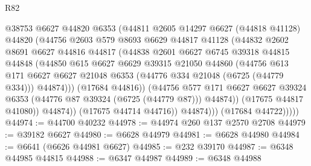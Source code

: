 \begin{lexlean}{R82}
\begin{coremodule}
                        @38753
                        @6627
                        @44820
                        @6353
                        (@44811
                          @2605
                          @14297
                          @6627
                          (@44818 @41128)
                          @44820
                          (@44756
                            @2603
                            @579
                            @8693
                            @6629
                            @44817
                            @41128
                            (@44832
                              @2602
                              @8691
                              @6627
                              @44816
                              @44817
                              (@44838
                                @2601
                                @6627
                                @6745
                                @39318
                                @44815
                                @44848
                                (@44850
                                  @615
                                  @6627
                                  @6629
                                  @39315
                                  @21050
                                  @44860
                                  (@44756
                                    @613
                                    @171
                                    @6627
                                    @6627
                                    @21048
                                    @6353
                                    (@44776 @334 @21048 (@6725 (@44779 @334)))
                                    @44874)))
                              (@17684 @44816))
                            (@44756
                              @577
                              @171
                              @6627
                              @6627
                              @39324
                              @6353
                              (@44776 @87 @39324 (@6725 (@44779 @87)))
                              @44874))
                          (@17675 @44817 @41080))
                        @44874))
                    (@17675 @44714 @44716))
                  @44874)))
            (@17684 @44722)))))
@44974 := @44700 @40232
@44978 := @44974 @260 @137 @2570 @2708
@44979 := @39182 @6627
@44980 := @6628 @44979
@44981 := @6628 @44980
@44984 := @6641 (@6626 @44981 @6627)
@44985 := @232 @39170
@44987 := @6348 @44985 @44815
@44988 := @6347 @44987
@44989 := @6348 @44988

\end{coremodule}
\end{lexlean}
